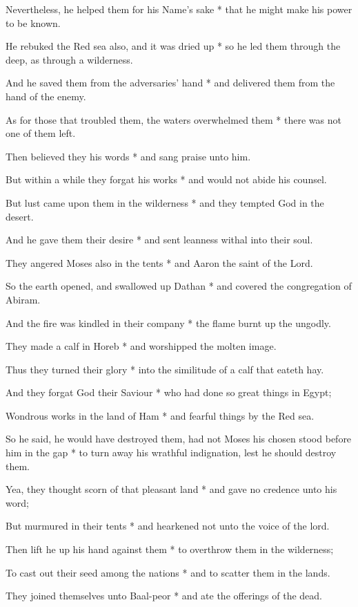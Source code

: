 Nevertheless, he helped them for his Name's sake * that he might make his power to be known.

He rebuked the Red sea also, and it was dried up * so he led them through the deep, as through a wilderness.

And he saved them from the adversaries' hand * and delivered them from the hand of the enemy.

As for those that troubled them, the waters overwhelmed them * there was not one of them left.

Then believed they his words * and sang praise unto him.

But within a while they forgat his works * and would not abide his counsel.

But lust came upon them in the wilderness * and they tempted God in the desert.

And he gave them their desire * and sent leanness withal into their soul.

They angered Moses also in the tents * and Aaron the saint of the Lord.

So the earth opened, and swallowed up Dathan * and covered the congregation of Abiram.

And the fire was kindled in their company * the flame burnt up the ungodly.

They made a calf in Horeb * and worshipped the molten image.

Thus they turned their glory * into the similitude of a calf that eateth hay.

And they forgat God their Saviour * who had done so great things in Egypt;

Wondrous works in the land of Ham * and fearful things by the Red sea.

So he said, he would have destroyed them, had not Moses his chosen stood before him in the gap * to turn away his wrathful indignation, lest he should destroy them.

Yea, they thought scorn of that pleasant land * and gave no credence unto his word;

But murmured in their tents * and hearkened not unto the voice of the lord.

Then lift he up his hand against them * to overthrow them in the wilderness;

To cast out their seed among the nations * and to scatter them in the lands.

They joined themselves unto Baal-peor * and ate the offerings of the dead.

